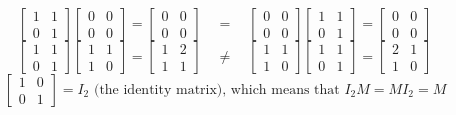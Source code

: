 \documentclass[12pt]{article}
\begin{document}
    \[ \begin{bmatrix}
        1 & 1 \\
        0 & 1
    \end{bmatrix}
    \begin{bmatrix}
        0 & 0 \\
        0 & 0
    \end{bmatrix}
    = \begin{bmatrix}
        0 & 0 \\
        0 & 0
    \end{bmatrix}
    \quad = \quad
    \begin{bmatrix}
        0 & 0 \\
        0 & 0
    \end{bmatrix}
    \begin{bmatrix}
        1 & 1 \\
        0 & 1
    \end{bmatrix}
    = \begin{bmatrix}
        0 & 0 \\
        0 & 0
    \end{bmatrix} \]
    \[ \begin{bmatrix}
        1 & 1 \\
        0 & 1
    \end{bmatrix}
    \begin{bmatrix}
        1 & 1 \\
        1 & 0
    \end{bmatrix}
    = \begin{bmatrix}
        1 & 2 \\
        1 & 1
    \end{bmatrix}
    \quad \neq \quad
    \begin{bmatrix}
        1 & 1 \\
        1 & 0
    \end{bmatrix}
    \begin{bmatrix}
        1 & 1 \\
        0 & 1
    \end{bmatrix}
    = \begin{bmatrix}
        2 & 1 \\
        1 & 0
    \end{bmatrix} \]
    \[ \begin{bmatrix}
        1 & 0 \\
        0 & 1
    \end{bmatrix}
    = I_2 \text{ (the identity matrix), which means that }
    I_2M = MI_2 = M \]
\end{document}
